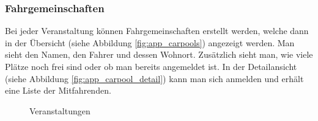 \subsubsection{Fahrgemeinschaften}
Bei jeder Veranstaltung können Fahrgemeinschaften erstellt werden, welche dann in der Übersicht (siehe Abbildung \ref{fig:app_carpools}) angezeigt werden. Man sieht den Namen, den Fahrer und dessen Wohnort. Zusätzlich sieht man, wie viele Plätze noch frei sind oder ob man bereits angemeldet ist. In der Detailansicht (siehe Abbildung \ref{fig:app_carpool_detail}) kann man sich anmelden und erhält eine Liste der Mitfahrenden.
\begin{figure}[ht]
\centering
{}
\label{fig:app_carpool_page}
\caption{Veranstaltungen}
\end{figure}

